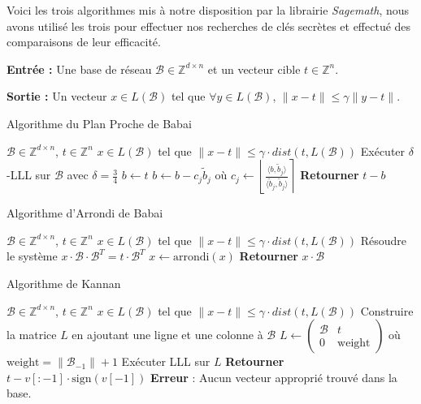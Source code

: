 \documentclass{backend}
\begin{document}
Voici les trois algorithmes mis à notre disposition par la librairie \textit{Sagemath}, nous avons utilisé les trois pour effectuer nos recherches de clés secrètes et effectué des comparaisons de leur efficacité. \medbreak

\textbf{Entrée :} Une base de réseau \(\mathcal{B} \in \mathbb{Z}^{d \times n}\) et un vecteur cible \(t \in \mathbb{Z}^n\).

\textbf{Sortie :} Un vecteur \(x \in L(\mathcal{B})\) tel que \(\forall y \in L(\mathcal{B})\), \(\|x - t\| \leq \gamma \|y - t\|\).
\medbreak


\begin{algorithm}
\caption{Algorithme du Plan Proche de Babai}
\begin{algorithmic}[1]
\Require \(\mathcal{B} \in \mathbb{Z}^{d \times n}\), \(t \in \mathbb{Z}^n\)
\Ensure \(x \in L(\mathcal{B})\) tel que \(\|x - t\| \leq \gamma \cdot dist(t, L(\mathcal{B}))\)
\State Exécuter \(\delta\)-LLL sur \(\mathcal{B}\) avec \(\delta = \frac{3}{4}\)
\State \(b \gets t\)
    \State \( b \gets b - c_j \tilde{b}_j \) où \( c_j \leftarrow \left\lfloor \frac{\langle b, \tilde{b}_j \rangle}{\langle \tilde{b}_j, \tilde{b}_j \rangle} \right\rceil \)
\EndFor
\State \textbf{Retourner} \(t - b\)
\end{algorithmic}
\end{algorithm}


\begin{algorithm}
\caption{Algorithme d'Arrondi de Babai}
\begin{algorithmic}[1]
\Require \(\mathcal{B} \in \mathbb{Z}^{d \times n}\), \(t \in \mathbb{Z}^n\)
\Ensure \(x \in L(\mathcal{B})\) tel que \(\|x - t\| \leq \gamma \cdot dist(t, L(\mathcal{B}))\)
\State Résoudre le système \(x \cdot \mathcal{B} \cdot \mathcal{B}^T = t \cdot \mathcal{B}^T\)
\State \(x \gets \text{arrondi}(x)\)
\State \textbf{Retourner} \(x \cdot \mathcal{B}\)
\end{algorithmic}
\end{algorithm}

\begin{algorithm}
\caption{Algorithme de Kannan}
\begin{algorithmic}[1]
\Require \(\mathcal{B} \in \mathbb{Z}^{d \times n}\), \(t \in \mathbb{Z}^n\)
\Ensure \(x \in L(\mathcal{B})\) tel que \(\|x - t\| \leq \gamma \cdot dist(t, L(\mathcal{B}))\)
\State Construire la matrice \(L\) en ajoutant une ligne et une colonne à \(\mathcal{B}\)
\State \(L \gets \begin{pmatrix} \mathcal{B} & t \\ 0 & \text{weight} \end{pmatrix}\) où \(\text{weight} = \|\mathcal{B}_{-1}\| + 1\)
\State Exécuter LLL sur \(L\)
        \State \textbf{Retourner} \(t - v[:-1] \cdot \text{sign}(v[-1])\)
    \EndIf
\EndFor
\State \textbf{Erreur} : Aucun vecteur approprié trouvé dans la base.
\end{algorithmic}
\end{algorithm}
\end{document}
